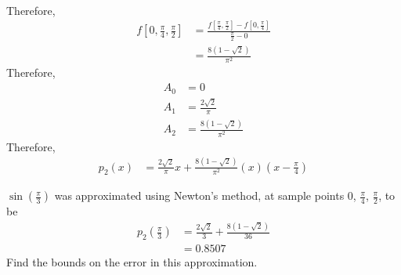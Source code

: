 \documentclass[fleqn, a4paper, 12pt, twoside]{article}
\theoremstyle{definition}
\theoremstyle{theorem}
\begin{document}
\begin{solution}
\begin{align*}
	\end{align*}
	Therefore,
	\begin{align*}
		f\left[ 0,\frac{\pi}{4},\frac{\pi}{2} \right] & = \frac{f\left[ \frac{\pi}{4},\frac{\pi}{2} \right] - f\left[ 0,\frac{\pi}{4} \right]}{\frac{\pi}{2} - 0} \\
                                                              & = \frac{8 (1 - \sqrt{2})}{\pi^2}
	\end{align*}
	Therefore,
	\begin{align*}
		A_0 & = 0                      \\
		A_1 & = \frac{2 \sqrt{2}}{\pi} \\
		A_2 & = \frac{8 (1 - \sqrt{2})}{\pi^2}
	\end{align*}
	Therefore,
	\begin{align*}
		p_2(x) & = \frac{2 \sqrt{2}}{\pi} x + \frac{8 (1 - \sqrt{2})}{\pi^2} (x) \left( x - \frac{\pi}{4} \right)
	\end{align*}
\end{solution}

\begin{question}
	$\sin\left( \frac{\pi}{3} \right)$ was approximated using Newton's method, at sample points $0$, $\frac{\pi}{4}$, $\frac{\pi}{2}$, to be
	\begin{align*}
		p_2\left( \frac{\pi}{3} \right) & = \frac{2 \sqrt{2}}{3} + \frac{8 (1 - \sqrt{2})}{36} \\
                                                & = 0.8507
	\end{align*}
	Find the bounds on the error in this approximation.
\end{question}
\end{document}

